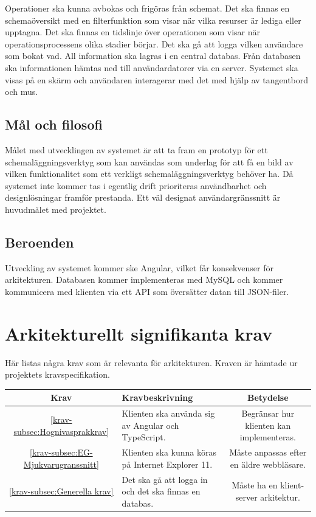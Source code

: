 \documentclass[a4paper,10pt]{article}
\begin{document}
Operationer ska kunna avbokas och frigöras från schemat. Det ska finnas en schemaöversikt med en filterfunktion som visar när vilka resurser är lediga eller upptagna. Det ska finnas en tidslinje över operationen som visar när operationsprocessens olika stadier börjar. Det ska gå att logga vilken användare som bokat vad. All information ska lagras i en central databas. Från databasen ska informationen hämtas ned till användardatorer via en server. Systemet ska visas på en skärm och användaren interagerar med det med hjälp av tangentbord och mus.


\subsection{Mål och filosofi}
Målet med utvecklingen av systemet är att ta fram en prototyp för ett schemaläggningsverktyg som kan användas som underlag för att få en bild av vilken funktionalitet som ett verkligt schemaläggningsverktyg behöver ha. Då systemet inte kommer tas i egentlig drift prioriteras användbarhet och designlösningar framför prestanda. Ett väl designat användargränssnitt är huvudmålet med projektet.

\subsection{Beroenden}
Utveckling av systemet kommer ske Angular, vilket får konsekvenser för arkitekturen. Databasen kommer implementeras med MySQL och kommer kommunicera med klienten via ett API som översätter datan till JSON-filer.

\section{Arkitekturellt signifikanta krav}
Här listas några krav som är relevanta för arkitekturen. Kraven är hämtade ur projektets kravspecifikation.

\begin{tabular}{|c|p{6cm}|c|}
  \hline
  Krav & Kravbeskrivning & Betydelse \\
  \hline
  \ref{krav-subsec:Hognivasprakkrav} & Klienten ska använda sig av Angular och TypeScript. & Begränsar hur klienten kan implementeras.
  \\
  \hline
  \ref{krav-subsec:EG-Mjukvarugranssnitt} & Klienten ska kunna köras på Internet Explorer 11. & Måste anpassas efter en äldre webbläsare.
  \\
  \hline
  \ref{krav-subsec:Generella krav} & Det ska gå att logga in och det ska \hyphenation{finnas}finnas en databas. & Måste ha en klient-server arkitektur.
  \\
  \hline
\end{tabular}
\end{document}
